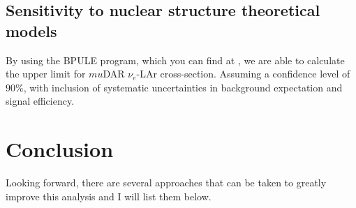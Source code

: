 \subsection{Sensitivity to nuclear structure theoretical models}
By using the BPULE program, which you can find at \cite{BPULE}, we are able to calculate the upper limit for $mu$DAR $\nu_e$-LAr cross-section. Assuming a confidence level of $90\%$, with inclusion of systematic uncertainties in background expectation and signal efficiency. 

\section{Conclusion}


Looking forward, there are several approaches that can be taken to greatly improve this analysis and I will list them below. 
